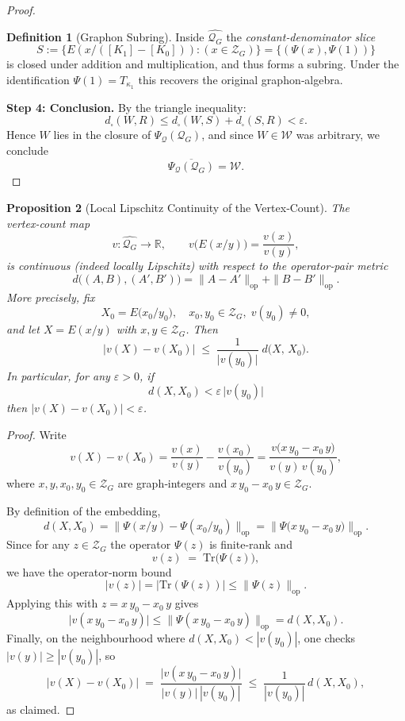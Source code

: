 \documentclass[11pt]{article}
\theoremstyle{definition}
\newtheorem{definition}{Definition}[section]
\theoremstyle{plain}
\newtheorem{proposition}[definition]{Proposition}
\theoremstyle{remark}
\begin{document}
\begin{proof}
\begin{definition}[Graphon Subring]
Inside $\widehat{\mathcal Q_G}$ the \emph{constant‐denominator slice}
\[
S
:=\bigl\{E(x/([K_1]-[K_0])):(x\in\mathcal Z_G)\bigr\}
=\bigl\{(\Psi(x),\Psi(1))\bigr\}
\]
is closed under addition and multiplication, and thus forms a subring.  Under the identification $\Psi(1)=T_{\kappa_1}$ this recovers the original graphon‐algebra.
\end{definition}

\textbf{Step 4: Conclusion.}
By the triangle inequality:
\[
  d_\square(W, R) \le d_\square(W, S) + d_\square(S, R) < \varepsilon.
\]
Hence \(W\) lies in the closure of \(\Psi_{\mathcal Q}(\mathcal Q_G)\), and since \(W\in\mathcal{W}\) was arbitrary, we conclude
\[
  \overline{\Psi_{\mathcal Q}(\mathcal Q_G)} = \mathcal{W}.
\]
\end{proof}

\begin{proposition}[Local Lipschitz Continuity of the Vertex‑Count]
The vertex‑count map
\[
  v:\widehat{\mathcal Q_G}\to\mathbb{R},
  \qquad
  v\bigl(E(x/y)\bigr)=\frac{v(x)}{v(y)},
\]
is continuous (indeed locally Lipschitz) with respect to the operator‑pair metric
\[
  d\bigl((A,B),(A',B')\bigr)
  =\|A-A'\|_{\mathrm{op}} + \|B-B'\|_{\mathrm{op}}.
\]
More precisely, fix 
\[
X_0 = E\bigl(x_0 / y_0\bigr),
\quad
x_0,y_0\in\mathcal Z_G,\;v(y_0)\neq0,
\]
and let $X=E(x/y)$ with $x,y\in\mathcal Z_G$.  Then
\[
\bigl|v(X)-v(X_0)\bigr|
\;\le\;
\frac{1}{\bigl|v(y_0)\bigr|}
\;d\bigl(X,\,X_0\bigr).
\]
In particular, for any $\varepsilon>0$, if 
\[
d(X,X_0)<\varepsilon\,\bigl|v(y_0)\bigr|
\]
then $|v(X)-v(X_0)|<\varepsilon$.
\end{proposition}

\begin{proof}
Write
\[
v(X)-v(X_0)
=\frac{v(x)}{v(y)}-\frac{v(x_0)}{v(y_0)}
=\frac{v\bigl(x\,y_0 - x_0\,y\bigr)}{v(y)\,v(y_0)},
\]
where $x,y,x_0,y_0\in\mathcal Z_G$ are graph‑integers and $x\,y_0-x_0\,y\in\mathcal Z_G$.

By definition of the embedding,
\[
d(X,X_0)
=\bigl\|\Psi(x/y)-\Psi(x_0/y_0)\bigr\|_{\mathrm{op}}
=\bigl\|\Psi\bigl(x\,y_0 - x_0\,y\bigr)\bigr\|_{\mathrm{op}}.
\]
Since for any $z\in\mathcal Z_G$ the operator $\Psi(z)$ is finite‑rank and
\[
v(z) \;=\;\mathrm{Tr}\bigl(\Psi(z)\bigr),
\]
we have the operator‐norm bound
\[
\bigl|v(z)\bigr|
=\bigl|\mathrm{Tr}(\Psi(z))\bigr|
\le \|\Psi(z)\|_{\mathrm{op}}.
\]
Applying this with $z = x\,y_0 - x_0\,y$ gives
\[
\bigl|v(x\,y_0 - x_0\,y)\bigr|
\le \bigl\|\Psi(x\,y_0 - x_0\,y)\bigr\|_{\mathrm{op}}
= d(X,X_0).
\]
Finally, on the neighbourhood where $d(X,X_0)<|v(y_0)|$, one checks $|v(y)|\ge|v(y_0)|$, so
\[
\bigl|v(X)-v(X_0)\bigr|
\;=\;
\frac{\bigl|v(x\,y_0 - x_0\,y)\bigr|}{|v(y)|\,|v(y_0)|}
\;\le\;
\frac{1}{|v(y_0)|}\,d(X,X_0),
\]
as claimed.
\end{proof}
\end{document}
